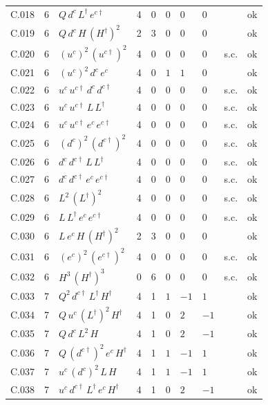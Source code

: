 {\begin{longtable}{@{}ll>{\raggedright\arraybackslash}p{6.4cm}rrllllr@{}}
C.018 & 6 & $Q\,d^c\,L^\dagger\,e^{c\dagger}$ & 4 & 0 & $0$ & $0$ & $0$ &  & ok \\
C.019 & 6 & $Q\,d^c\,H\,(H^\dagger)^{2}$ & 2 & 3 & $0$ & $0$ & $0$ &  & ok \\
C.020 & 6 & $(u^c)^{2}\,(u^{c\dagger})^{2}$ & 4 & 0 & $0$ & $0$ & $0$ & s.c. & ok \\
C.021 & 6 & $(u^c)^{2}\,d^c\,e^c$ & 4 & 0 & $1$ & $1$ & $0$ &  & ok \\
C.022 & 6 & $u^c\,u^{c\dagger}\,d^c\,d^{c\dagger}$ & 4 & 0 & $0$ & $0$ & $0$ & s.c. & ok \\
C.023 & 6 & $u^c\,u^{c\dagger}\,L\,L^\dagger$ & 4 & 0 & $0$ & $0$ & $0$ & s.c. & ok \\
C.024 & 6 & $u^c\,u^{c\dagger}\,e^c\,e^{c\dagger}$ & 4 & 0 & $0$ & $0$ & $0$ & s.c. & ok \\
C.025 & 6 & $(d^c)^{2}\,(d^{c\dagger})^{2}$ & 4 & 0 & $0$ & $0$ & $0$ & s.c. & ok \\
C.026 & 6 & $d^c\,d^{c\dagger}\,L\,L^\dagger$ & 4 & 0 & $0$ & $0$ & $0$ & s.c. & ok \\
C.027 & 6 & $d^c\,d^{c\dagger}\,e^c\,e^{c\dagger}$ & 4 & 0 & $0$ & $0$ & $0$ & s.c. & ok \\
C.028 & 6 & $L^{2}\,(L^\dagger)^{2}$ & 4 & 0 & $0$ & $0$ & $0$ & s.c. & ok \\
C.029 & 6 & $L\,L^\dagger\,e^c\,e^{c\dagger}$ & 4 & 0 & $0$ & $0$ & $0$ & s.c. & ok \\
C.030 & 6 & $L\,e^c\,H\,(H^\dagger)^{2}$ & 2 & 3 & $0$ & $0$ & $0$ &  & ok \\
C.031 & 6 & $(e^c)^{2}\,(e^{c\dagger})^{2}$ & 4 & 0 & $0$ & $0$ & $0$ & s.c. & ok \\
C.032 & 6 & $H^{3}\,(H^\dagger)^{3}$ & 0 & 6 & $0$ & $0$ & $0$ & s.c. & ok \\
C.033 & 7 & $Q^{2}\,d^{c\dagger}\,L^\dagger\,H^\dagger$ & 4 & 1 & $1$ & $-1$ & $1$ &  & ok \\
C.034 & 7 & $Q\,u^c\,(L^\dagger)^{2}\,H^\dagger$ & 4 & 1 & $0$ & $2$ & $-1$ &  & ok \\
C.035 & 7 & $Q\,d^c\,L^{2}\,H$ & 4 & 1 & $0$ & $2$ & $-1$ &  & ok \\
C.036 & 7 & $Q\,(d^{c\dagger})^{2}\,e^c\,H^\dagger$ & 4 & 1 & $1$ & $-1$ & $1$ &  & ok \\
C.037 & 7 & $u^c\,(d^c)^{2}\,L\,H$ & 4 & 1 & $1$ & $-1$ & $1$ &  & ok \\
C.038 & 7 & $u^c\,d^{c\dagger}\,L^\dagger\,e^c\,H^\dagger$ & 4 & 1 & $0$ & $2$ & $-1$ &  & ok \\

\end{longtable}}
